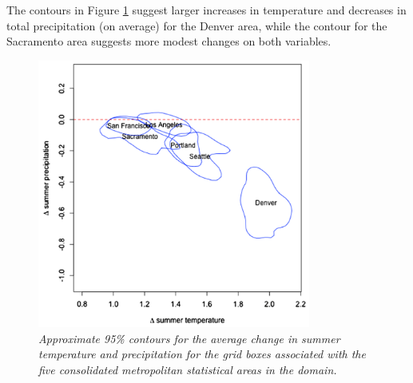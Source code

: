 \documentclass[12pt]{amsart}
\begin{document}
The contours in Figure \ref{fig: Fig14} suggest larger increases in temperature and decreases in total precipitation (on average) for the Denver area, while the contour for the Sacramento area suggests more modest changes on both variables.

\begin{figure}[H]
    \centering
    \includegraphics[width = 0.8\textwidth]{Fig14.png}
    \caption{\emph{Approximate 95\% contours for the average change in summer temperature and precipitation for the grid boxes associated with the five consolidated metropolitan statistical areas in the domain.}}
    \label{fig: Fig14}
\end{figure}

 
 
\end{document}
